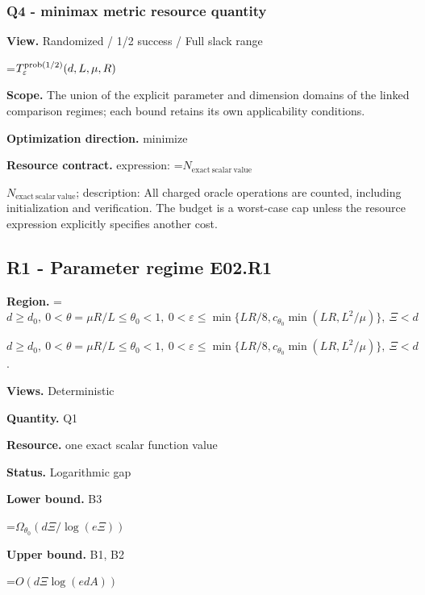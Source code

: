 \documentclass[10pt,a4paper]{article}
\newcommand{\AtlasMath}[1]{\par\begingroup\centering\setbox0=\hbox{$\displaystyle #1$}\ifdim\wd0>1.4\linewidth\typeout{ATLAS WIDE FORMULA: \the\wd0}\fi\ifdim\wd0>\linewidth\resizebox{\linewidth}{!}{\box0}\else\box0\fi\par\endgroup}
\newcommand{\AtlasInlineMath}[1]{\begingroup\setbox0=\hbox{$#1$}\ifdim\wd0>.4\linewidth\endgroup\AtlasMath{#1}\else\endgroup$#1$\fi}
\begin{document}
\subsubsection{Q4 - minimax metric resource quantity}


\textbf{View.} Randomized / 1/2 success / Full slack range



\AtlasMath{T_\varepsilon^{\rm prob(1/2)}(d,L,\mu,R)}


\textbf{Scope.} The union of the explicit parameter and dimension domains of the linked comparison regimes; each bound retains its own applicability conditions.



\textbf{Optimization direction.} minimize



\textbf{Resource contract.} expression: \AtlasInlineMath{N_{\mathrm{exact\ scalar\ value}}}; description: All charged oracle operations are counted, including initialization and verification. The budget is a worst-case cap unless the resource expression explicitly specifies another cost.



\subsection{R1 - Parameter regime E02.R1}


\textbf{Region.} \AtlasInlineMath{d\ge d_0,\ 0<\theta=\mu R/L\le\theta_0<1,\ 0<\varepsilon\le\min\{LR/8,c_{\theta_0}\min(LR,L^2/\mu)\},\ \Xi<d}.



\textbf{Views.} Deterministic



\textbf{Quantity.} Q1



\textbf{Resource.} one exact scalar function value



\textbf{Status.} Logarithmic gap



\textbf{Lower bound.} B3



\AtlasMath{\Omega_{\theta_0}(d\Xi/\log(e\Xi))}


\textbf{Upper bound.} B1, B2



\AtlasMath{O(d\Xi\log(edA))}
\end{document}
